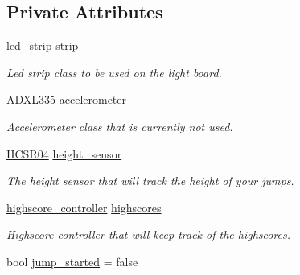 \subsection*{Private Attributes}
\begin{DoxyCompactItemize}
\item 
\hyperlink{classled__strip}{led\+\_\+strip} \hyperlink{classlight__board_a350253c03ce43fa63581e2fabae71ff4}{strip}\hypertarget{classlight__board_a350253c03ce43fa63581e2fabae71ff4}{}\label{classlight__board_a350253c03ce43fa63581e2fabae71ff4}

\begin{DoxyCompactList}\small\item\em Led strip class to be used on the light board. \end{DoxyCompactList}\item 
\hyperlink{classADXL335}{A\+D\+X\+L335} \hyperlink{classlight__board_a8bff254fba1927ad510f18a6a8239b57}{accelerometer}\hypertarget{classlight__board_a8bff254fba1927ad510f18a6a8239b57}{}\label{classlight__board_a8bff254fba1927ad510f18a6a8239b57}

\begin{DoxyCompactList}\small\item\em Accelerometer class that is currently not used. \end{DoxyCompactList}\item 
\hyperlink{classHCSR04}{H\+C\+S\+R04} \hyperlink{classlight__board_a1cfdc254b89c950cf3f6216518c19e92}{height\+\_\+sensor}\hypertarget{classlight__board_a1cfdc254b89c950cf3f6216518c19e92}{}\label{classlight__board_a1cfdc254b89c950cf3f6216518c19e92}

\begin{DoxyCompactList}\small\item\em The height sensor that will track the height of your jumps. \end{DoxyCompactList}\item 
\hyperlink{classhighscore__controller}{highscore\+\_\+controller} \hyperlink{classlight__board_a992bdaba8c6facec48f770f642d4fa3f}{highscores}\hypertarget{classlight__board_a992bdaba8c6facec48f770f642d4fa3f}{}\label{classlight__board_a992bdaba8c6facec48f770f642d4fa3f}

\begin{DoxyCompactList}\small\item\em Highscore controller that will keep track of the highscores. \end{DoxyCompactList}\item 
bool \hyperlink{classlight__board_a57b13a5f6c129b5b2aecf01da11e9388}{jump\+\_\+started} = false\hypertarget{classlight__board_a57b13a5f6c129b5b2aecf01da11e9388}{}\label{classlight__board_a57b13a5f6c129b5b2aecf01da11e9388}


\end{DoxyCompactItemize}
